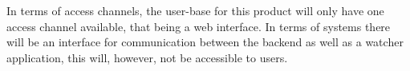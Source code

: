In terms of access channels, the user-base for this product will only have one access channel available, that being a web interface. In terms of systems there will be an interface for communication between the backend as well as a watcher application, this will, however, not be accessible to users.  